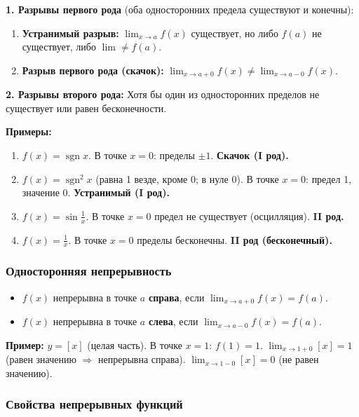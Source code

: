 \textbf{1. Разрывы первого рода} (оба односторонних предела существуют и конечны):
\begin{enumerate}
	\item \textbf{Устранимый разрыв:} $\lim_{x\to a} f(x)$ существует, но либо $f(a)$ не существует, либо $\lim \neq f(a)$.
	\item \textbf{Разрыв первого рода (скачок):} $\lim_{x\to a+0} f(x) \neq \lim_{x\to a-0} f(x)$.
\end{enumerate}

\textbf{2. Разрывы второго рода:}
Хотя бы один из односторонних пределов не существует или равен бесконечности.

\textbf{Примеры:}
\begin{enumerate}
	\item $f(x) = \operatorname{sgn} x$. В точке $x=0$: пределы $\pm 1$. \textbf{Скачок (I род).}
	\item $f(x) = \operatorname{sgn}^2 x$ (равна 1 везде, кроме 0; в нуле 0). В точке $x=0$: предел 1, значение 0. \textbf{Устранимый (I род).}
	\item $f(x) = \sin \frac{1}{x}$. В точке $x=0$ предел не существует (осцилляция). \textbf{II род.}
	\item $f(x) = \frac{1}{x}$. В точке $x=0$ пределы бесконечны. \textbf{II род (бесконечный).}
\end{enumerate}

\subsubsection*{Односторонняя непрерывность}

\begin{tcolorbox}
	\begin{itemize}
		\item $f(x)$ непрерывна в точке $a$ \textbf{справа}, если $\lim_{x\to a + 0} f(x) = f(a)$.
		\item $f(x)$ непрерывна в точке $a$ \textbf{слева}, если $\lim_{x\to a - 0} f(x) = f(a)$.
	\end{itemize}
\end{tcolorbox}
\textbf{Пример:} $y = [x]$ (целая часть).
В точке $x=1$: $f(1) = 1$.
$\lim_{x\to 1+0} [x] = 1$ (равен значению $\Rightarrow$ непрерывна справа).
$\lim_{x\to 1-0} [x] = 0$ (не равен значению).

\subsubsection*{Свойства непрерывных функций}

